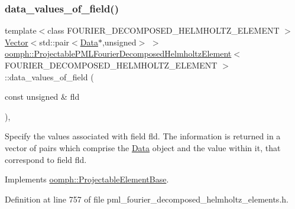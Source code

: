 \subsubsection{\texorpdfstring{data\+\_\+values\+\_\+of\+\_\+field()}{data\_values\_of\_field()}}
{\footnotesize\ttfamily template$<$class F\+O\+U\+R\+I\+E\+R\+\_\+\+D\+E\+C\+O\+M\+P\+O\+S\+E\+D\+\_\+\+H\+E\+L\+M\+H\+O\+L\+T\+Z\+\_\+\+E\+L\+E\+M\+E\+NT $>$ \\
\hyperlink{classoomph_1_1Vector}{Vector}$<$std\+::pair$<$\hyperlink{classoomph_1_1Data}{Data}$\ast$,unsigned$>$ $>$ \hyperlink{classoomph_1_1ProjectablePMLFourierDecomposedHelmholtzElement}{oomph\+::\+Projectable\+P\+M\+L\+Fourier\+Decomposed\+Helmholtz\+Element}$<$ F\+O\+U\+R\+I\+E\+R\+\_\+\+D\+E\+C\+O\+M\+P\+O\+S\+E\+D\+\_\+\+H\+E\+L\+M\+H\+O\+L\+T\+Z\+\_\+\+E\+L\+E\+M\+E\+NT $>$\+::data\+\_\+values\+\_\+of\+\_\+field (\begin{DoxyParamCaption}\item[{const unsigned \&}]{fld }\end{DoxyParamCaption})\hspace{0.3cm}{\ttfamily [inline]}, {\ttfamily [virtual]}}



Specify the values associated with field fld. The information is returned in a vector of pairs which comprise the \hyperlink{classoomph_1_1Data}{Data} object and the value within it, that correspond to field fld. 



Implements \hyperlink{classoomph_1_1ProjectableElementBase_a644306ebdf16f334344c2d27d72f18b7}{oomph\+::\+Projectable\+Element\+Base}.



Definition at line 757 of file pml\+\_\+fourier\+\_\+decomposed\+\_\+helmholtz\+\_\+elements.\+h.

\mbox{\label{classoomph_1_1ProjectablePMLFourierDecomposedHelmholtzElement_a53156274a681c286bbb20920e925b55e}} 
